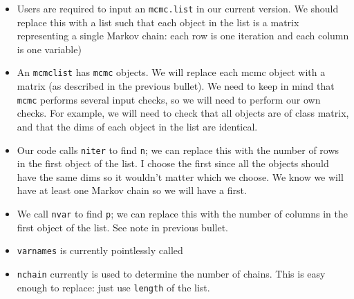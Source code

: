 \documentclass[12pt]{article}
\theoremstyle{remark}
\begin{document}
\begin{itemize}
 \renewcommand{\labelitemi}{$\blacksquare$}
\item Users are required to input an \texttt{mcmc.list} in our current version. We should replace this with a list such that each object in the list is a matrix representing a single Markov chain: each row is one iteration and each column is one variable)
\item An \texttt{mcmclist} has \texttt{mcmc} objects. We will replace each mcmc object with a matrix (as described in the previous bullet). We need to keep in mind that \texttt{mcmc} performs several input checks, so we will need to perform our own checks. For example, we will need to check that all objects are of class matrix, and that the dims of each object in the list are identical. 

\item Our code calls \texttt{niter} to find \texttt{n}; we can replace this with the number of rows in the first object of the list. I choose the first since all the objects should have the same dims so it wouldn't matter which we choose. We know we will have at least one Markov chain so we will have a first.
\item We call \texttt{nvar} to find \texttt{p}; we can replace this with the number of columns in the first object of the list. See note in previous bullet.
\item \texttt{varnames} is currently pointlessly called
\item \texttt{nchain} currently is used to determine the number of chains. This is easy enough to replace: just use \texttt{length} of the list.
\end{itemize}










\end{document}
